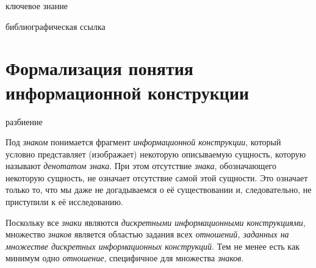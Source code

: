 \begin{SCn}
    \begin{scnrelfromlist}{ключевое знание}
    \end{scnrelfromlist}

    \bigskip

    \begin{scnrelfromlist}{библиографическая ссылка}
    \end{scnrelfromlist}

\end{SCn}

\section{Формализация понятия информационной конструкции}
\label{section_information_construction_formalization}

\begin{SCn}

    \begin{scnrelfromset}{разбиение}
    \end{scnrelfromset}

\end{SCn}

Под \textit{знаком} понимается фрагмент \textit{информационной конструкции}, который условно представляет (изображает) некоторую описываемую сущность, которую называют \textit{денотатом знака}.
При этом отсутствие \textit{знака}, обозначающего некоторую сущность, не означает отсутствие самой этой сущности.
Это означает только то, что мы даже не догадываемся о её существовании и, следовательно, не приступили к её исследованию.

Поскольку все \textit{знаки} являются \textit{дискретными информационными конструкциями}, множество \textit{знаков} является областью задания всех \textit{отношений, заданных на множестве дискретных \textit{информационных конструкций}}.
Тем не менее есть как минимум одно \textit{отношение}, специфичное для множества \textit{знаков}.

